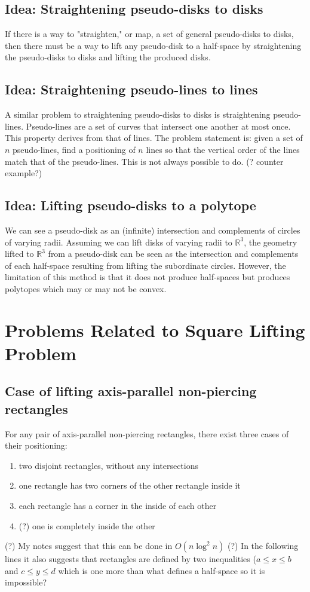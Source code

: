 \documentclass{NSF}
\begin{document}
\subsection{Idea: Straightening pseudo-disks to disks}
If there is a way to "straighten," or map, a set of general pseudo-disks to disks, then there must be a way to lift any pseudo-disk to a half-space by straightening the pseudo-disks to disks and lifting the produced disks.

\subsection{Idea: Straightening pseudo-lines to lines}
A similar problem to straightening pseudo-disks to disks is straightening pseudo-lines. Pseudo-lines are a set of curves that intersect one another at most once. This property derives from that of lines. The problem statement is:  given a set of $n$ pseudo-lines, find a positioning of $n$ lines so that the vertical order of the lines match that of the pseudo-lines. This is not always possible to do. (? counter example?)




\subsection{Idea: Lifting pseudo-disks to a polytope}
We can see a pseudo-disk as an (infinite) intersection and complements of circles of varying radii. Assuming we can lift disks of varying radii to $\mathbb{R}^3$, the geometry lifted to $\mathbb{R}^3$  from a pseudo-disk can be seen as the intersection and complements of each half-space resulting from lifting the subordinate circles. However, the limitation of this method is that it does not produce half-spaces but produces polytopes which may or may not be convex.




\section{Problems Related to Square Lifting Problem}

\subsection{Case of lifting axis-parallel non-piercing rectangles}
For any pair of axis-parallel non-piercing rectangles, there exist three cases of their positioning:
\begin{enumerate}
\item two disjoint rectangles, without any intersections
\item one rectangle has two corners of the other rectangle inside it
\item each rectangle has a corner in the inside of each other
\item (?) one is completely inside the other
\end{enumerate}
(?) My notes suggest that this can be done in $O(n\log^2{n})$
(?) In the following lines it also suggests that rectangles are defined by two inequalities ($a\leq x \leq b$ and $c \leq y \leq d$ which is one more than what defines a half-space so it is impossible?
\end{document}
